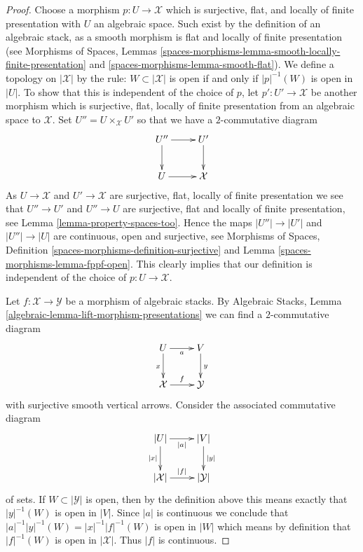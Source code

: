 \begin{proof}
Choose a morphism $p : U \to \mathcal{X}$ which is
surjective, flat, and locally of finite presentation
with $U$ an algebraic space. Such exist by the definition of an algebraic
stack, as a smooth morphism is flat and locally of finite presentation
(see
Morphisms of Spaces,
Lemmas \ref{spaces-morphisms-lemma-smooth-locally-finite-presentation} and
\ref{spaces-morphisms-lemma-smooth-flat}).
We define a topology on $|\mathcal{X}|$ by the rule:
$W \subset |\mathcal{X}|$ is open if and only if $|p|^{-1}(W)$ is open
in $|U|$. To show that this is independent of the choice of $p$, let
$p' : U' \to \mathcal{X}$ be another morphism which is surjective, flat,
locally of finite presentation from an algebraic space to
$\mathcal{X}$. Set $U'' = U \times_{\mathcal{X}} U'$
so that we have a $2$-commutative diagram
$$
\xymatrix{
U'' \ar[r] \ar[d] & U' \ar[d] \\
U \ar[r] & \mathcal{X}
}
$$
As $U \to \mathcal{X}$ and $U' \to \mathcal{X}$ are surjective, flat,
locally of finite presentation we see that $U'' \to U'$ and $U'' \to U$
are surjective, flat and locally of finite presentation, see
Lemma \ref{lemma-property-spaces-too}.
Hence the maps $|U''| \to |U'|$ and $|U''| \to |U|$ are continuous, open
and surjective, see
Morphisms of Spaces,
Definition \ref{spaces-morphisms-definition-surjective} and
Lemma \ref{spaces-morphisms-lemma-fppf-open}.
This clearly implies that our definition is independent of the choice
of $p : U \to \mathcal{X}$.

\medskip\noindent
Let $f : \mathcal{X} \to \mathcal{Y}$ be a morphism of algebraic stacks.
By
Algebraic Stacks, Lemma \ref{algebraic-lemma-lift-morphism-presentations}
we can find a $2$-commutative diagram
$$
\xymatrix{
U \ar[d]_x \ar[r]_a & V \ar[d]^y \\
\mathcal{X} \ar[r]^f & \mathcal{Y}
}
$$
with surjective smooth vertical arrows.
Consider the associated commutative diagram
$$
\xymatrix{
|U| \ar[d]_{|x|} \ar[r]_{|a|} & |V| \ar[d]^{|y|} \\
|\mathcal{X}| \ar[r]^{|f|} & |\mathcal{Y}|
}
$$
of sets. If $W \subset |\mathcal{Y}|$ is open, then by the definition
above this means exactly that $|y|^{-1}(W)$ is open in $|V|$. Since
$|a|$ is continuous we conclude that
$|a|^{-1}|y|^{-1}(W) = |x|^{-1}|f|^{-1}(W)$ is open in $|W|$ which means
by definition that $|f|^{-1}(W)$ is open in $|\mathcal{X}|$.
Thus $|f|$ is continuous.


\end{proof}
